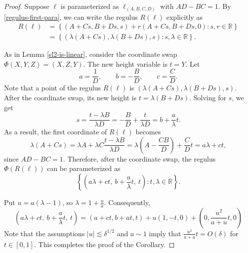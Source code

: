 \documentclass[10pt,a4paper]{amsart}
\begin{document}
\begin{proof}
Suppose $\ell$ is parameterized as $\ell_{(A,B,C,D)}$ with $AD-BC=1$.
By \eqref{regulus-first-para}, we can write the regulus $R(\ell)$ explicitly as
\begin{align}
\label{regulus-para-explicit}
    R(\ell)&=\left\{(A+Cs,B+Ds,s)+r(A+Cs,B+Ds,0):    s,r\in\mathbb R\right\}\\
    &=\left\{
    (\lambda(A+Cs),\lambda(B+Ds),s):
    s,\lambda\in\mathbb R
    \right\}.
\end{align}


As in Lemma \ref{sl2-is-linear}, consider the coordinate swap $\Phi(X,Y,Z)=(X,Z,Y)$.
The new height variable is $t=Y$. 
Let
\begin{equation}
    a=\frac1D,\qquad b=-\frac BD,\qquad c=\frac CD.
\end{equation}
Note that a point of the regulus $R(\ell)$ is $(\lambda(A+Cs),\lambda(B+Ds),s)$.
After the coordinate swap, its new height is $t=\lambda(B+Ds)$.
Solving for $s$, we get
\begin{equation}
    s=\frac{t-\lambda B}{\lambda D}
      =
      -\frac BD+\frac{t}{\lambda D}
      =
      b+\frac a\lambda t.
\end{equation}
As a result, the first coordinate of $R(\ell)$ becomes
\begin{equation}
        \lambda(A+Cs)
    =
    \lambda A+\lambda C\frac{t-\lambda B}{\lambda D}
    =
    \lambda\left(A-\frac{CB}{D}\right)+\frac CD t=a\lambda+ct,
\end{equation}
since $AD-BC=1$.
Therefore, after the coordinate swap, the regulus $\Phi(R(\ell))$ can be parameterized as
\begin{equation}
    \left\{
    \left(a\lambda+ct,\ b+\frac a\lambda t,\ t\right):
    t,\lambda\in\mathbb R
    \right\}.
\end{equation}

\smallskip 

Put $ u=a(\lambda-1)$, so $\lambda=1+\frac ua$.
Consequently,
\begin{equation}
    \left(a\lambda+ct,\ b+\frac a\lambda t,\ t\right)
    =
    (a+ct,b+at,t)+u(1,-t,0)
    +
    \left(0,\frac{u^2}{a+u}t,0\right)
\end{equation}
Note that the assumptions $|u|\lesssim \delta^{1/2}$ and $a\sim 1$ imply that $\frac{u^2}{a+u}t=O(\delta)$
for $t\in[0,1]$. 
This completes the proof of the Corollary.
\qedhere



\end{proof}
\end{document}
